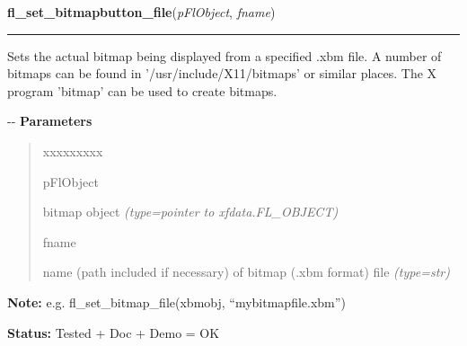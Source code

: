     \vspace{0.5ex}

\hspace{.8\funcindent}\begin{boxedminipage}{\funcwidth}

    \raggedright \textbf{fl\_set\_bitmapbutton\_file}(\textit{pFlObject}, \textit{fname})

    \vspace{-1.5ex}

    \rule{\textwidth}{0.5\fboxrule}
\setlength{\parskip}{2ex}

Sets the actual bitmap being displayed from a specified .xbm file. A
number of bitmaps can be found in '/usr/include/X11/bitmaps' or similar
places. The X program 'bitmap' can be used to create bitmaps.

-{}-
\setlength{\parskip}{1ex}
      \textbf{Parameters}
      \vspace{-1ex}

      \begin{quote}
        \begin{Ventry}{xxxxxxxxx}

          \item[pFlObject]


bitmap object
            {\it (type=pointer to xfdata.FL\_OBJECT)}

          \item[fname]


name (path included if necessary) of bitmap (.xbm format) file
            {\it (type=str)}

        \end{Ventry}

      \end{quote}

\textbf{Note:} 
e.g. fl\_set\_bitmap\_file(xbmobj, ``mybitmapfile.xbm'')


\textbf{Status:} 
Tested + Doc + Demo = OK


    \end{boxedminipage}

    \label{xformslib:flbitmap:fl_set_bitmap_file}

    \vspace{0.5ex}

